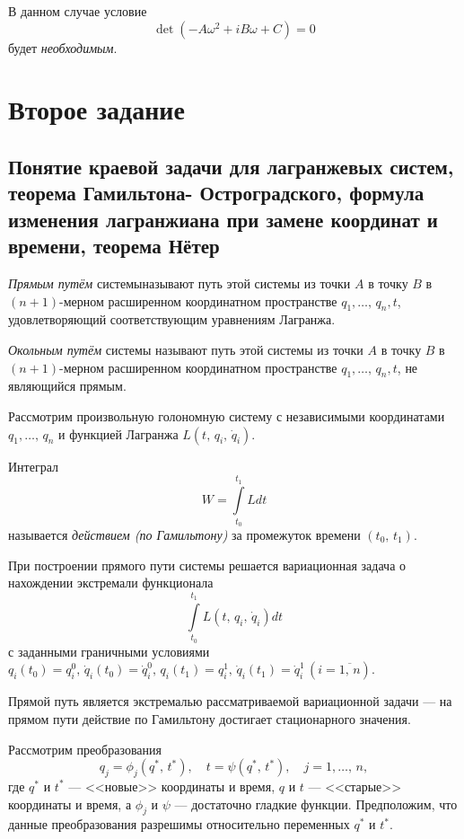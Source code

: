 \documentclass[a4paper]{article}
\begin{document}
В данном случае условие
\[
	\det (-A \omega^2 +i B\omega+C)=0
\] 
будет  \emph{необходимым}.
\section{Второе задание}
\subsection{Понятие краевой задачи для лагранжевых систем, теорема Гамильтона-
Остроградского, формула изменения лагранжиана при замене координат и
времени, теорема Нётер}
\begin{dfn}
	\emph{Прямым путём} системыназывают путь этой системы из точки $A$ в
	точку  $B$ в $(n+1)$-мерном расширенном координатном пространстве
	$q_1,\ldots,\,q_n,t$, удовлетворяющий соответствующим уравнениям
	Лагранжа.
\end{dfn}
\begin{dfn}
	\emph{Окольным путём} системы называют путь этой системы из точки $A$ в
	точку  $B$ в $(n+1)$-мерном расширенном координатном пространстве
	$q_1,\ldots,\,q_n,t$, не являющийся прямым.
\end{dfn}
Рассмотрим произвольную голономную систему с независимыми координатами
$q_1,\ldots,\,q_n$ и функцией Лагранжа $L\left(t,\,q_i,\,\dot{q}_i\right)$.
\begin{dfn}
	Интеграл
	\[
	W=\int\limits_{t_0}^{t_1} L dt 
	\] 
	называется \emph{действием (по Гамильтону)} за промежуток времени
	$(t_0,\,t_1)$.
\end{dfn}
При построении прямого пути системы решается вариационная задача о нахождении
экстремали функционала
\[
	\int\limits_{t_0}^{t_1} L\left( t,\,q_i,\,\dot{q}_i \right) dt
\] с заданными граничными условиями $q_i(t_0)=q_i^0,\,\dot{q}_i(t_0)=\dot{q}_i^0,\,
q_i(t_1)=q_i^1,\,\dot{q}_i(t_1)=\dot{q}_i^1\, \left( i=\overline{1,\,n} \right) $.
\begin{thm}
	Прямой путь является экстремалью рассматриваемой вариационной задачи
	--- на прямом пути действие по Гамильтону достигает стационарного
	значения.
\end{thm}
Рассмотрим преобразования
\[
	q_j=\phi_j(q^*,\,t^*),\quad t=\psi(q^*,\,t^*), \quad j=1,\ldots,\,n,
\] 
где $q^*$ и $t^*$ ---  <<новые>> координаты и время, $q$ и $t$ --- <<старые>>
координаты и время, а $\phi_j$ и $\psi$ --- достаточно гладкие функции.
Предположим, что данные преобразования разрешимы относительно переменных
$q^*$ и  $t^*$.
\end{document}
